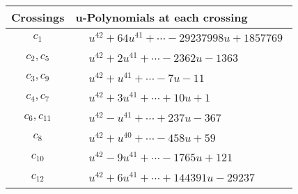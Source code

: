 \documentclass[1p]{elsarticle_modified}
\theoremstyle{definition}
\begin{document}
\begin{tabular}{m{50pt}|m{274pt}}
Crossings & \hspace{64pt}u-Polynomials at each crossing \\
\hline $$\begin{aligned}c_{1}\end{aligned}$$&$\begin{aligned}
&u^{42}+64 u^{41}+\cdots-29237998 u+1857769
\end{aligned}$\\
\hline $$\begin{aligned}c_{2},c_{5}\end{aligned}$$&$\begin{aligned}
&u^{42}+2 u^{41}+\cdots-2362 u-1363
\end{aligned}$\\
\hline $$\begin{aligned}c_{3},c_{9}\end{aligned}$$&$\begin{aligned}
&u^{42}+u^{41}+\cdots-7 u-11
\end{aligned}$\\
\hline $$\begin{aligned}c_{4},c_{7}\end{aligned}$$&$\begin{aligned}
&u^{42}+3 u^{41}+\cdots+10 u+1
\end{aligned}$\\
\hline $$\begin{aligned}c_{6},c_{11}\end{aligned}$$&$\begin{aligned}
&u^{42}- u^{41}+\cdots+237 u-367
\end{aligned}$\\
\hline $$\begin{aligned}c_{8}\end{aligned}$$&$\begin{aligned}
&u^{42}+u^{40}+\cdots-458 u+59
\end{aligned}$\\
\hline $$\begin{aligned}c_{10}\end{aligned}$$&$\begin{aligned}
&u^{42}-9 u^{41}+\cdots-1765 u+121
\end{aligned}$\\
\hline $$\begin{aligned}c_{12}\end{aligned}$$&$\begin{aligned}
&u^{42}+6 u^{41}+\cdots+144391 u-29237
\end{aligned}$\\
\hline
\end{tabular}\\~\\
\end{document}

